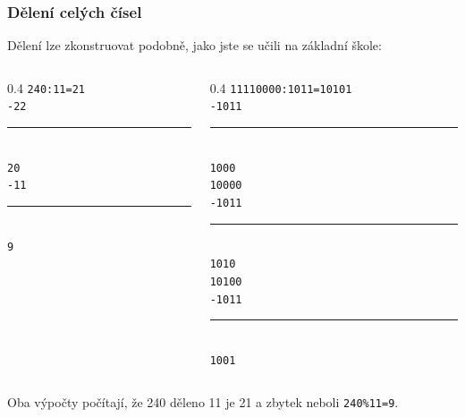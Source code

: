 \begin{frame}
\frametitle{Dělení celých čísel}

Dělení lze zkonstruovat podobně, jako jste se učili na základní škole:
\bigskip
\begin{columns}
\begin{column}{0.4\textwidth}
\texttt{\phantom{-}240:11=21}\\
\texttt{-22}\\
\vspace{-8pt}
\rule[0pt]{1cm}{0.1pt}\\
\texttt{\phantom{xx}20}\\
\texttt{\phantom{x}-11}\\
\vspace{-8pt}
\rule[0pt]{1cm}{0.1pt}\\
\texttt{\phantom{xxx}9}\\
\end{column}
\hfill
\begin{column}{0.4\textwidth}
\texttt{\phantom{x}11110000:1011=10101}\\
\texttt{-1011}\\
\vspace{-8pt}
\rule[0pt]{1cm}{0.4pt}\\
\texttt{\phantom{xx}1000}\\
\texttt{\phantom{xx}10000}\\
\texttt{\phantom{xx}-1011}\\
\vspace{-8pt}
\rule[0pt]{1.4cm}{0.4pt}\\
\texttt{\phantom{xxxx}1010}\\
\texttt{\phantom{xxxx}10100}\\
\texttt{\phantom{xxxx}-1011}\\
\vspace{-8pt}
\rule[0pt]{1.8cm}{0.4pt}\\
\texttt{\phantom{xxxxx}1001}\\
\end{column}
\end{columns}
\bigskip
Oba výpočty počítají, že 240 děleno 11 je 21 a zbytek neboli \texttt{240\%11=9}.

\end{frame}


